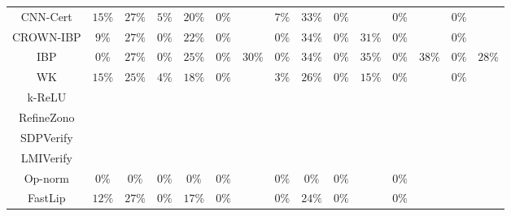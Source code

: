 \begin{table*}
{\begin{tabular}{c|c|c|c|c|c|c|c|c|c|c|c|c|c|c}
     CNN-Cert &        $15\%$ &        $27\%$ &         $5\%$ &        $20\%$ &         $0\%$ &               &         $7\%$ &        $33\%$ &         $0\%$ &               &         $0\%$ &               &         $0\%$ &               \\
    CROWN-IBP &         $9\%$ &        $27\%$ &         $0\%$ &        $22\%$ &         $0\%$ &               &         $0\%$ &        $34\%$ &         $0\%$ &        $31\%$ &         $0\%$ &               &         $0\%$ &               \\
          IBP &         $0\%$ &        $27\%$ &         $0\%$ &        $25\%$ &         $0\%$ &        $30\%$ &         $0\%$ &        $34\%$ &         $0\%$ &        $35\%$ &         $0\%$ &        $38\%$ &         $0\%$ &        $28\%$ \\
           WK &        $15\%$ &        $25\%$ &         $4\%$ &        $18\%$ &         $0\%$ &               &         $3\%$ &        $26\%$ &         $0\%$ &        $15\%$ &         $0\%$ &               &         $0\%$ &               \\
       k-ReLU &               &               &               &               &               &               &               &               &               &               &               &               &               &               \\
   RefineZono &               &               &               &               &               &               &               &               &               &               &               &               &               &               \\
    SDPVerify &               &               &               &               &               &               &               &               &               &               &               &               &               &               \\
    LMIVerify &               &               &               &               &               &               &               &               &               &               &               &               &               &               \\
      Op-norm &         $0\%$ &         $0\%$ &         $0\%$ &         $0\%$ &         $0\%$ &               &         $0\%$ &         $0\%$ &         $0\%$ &               &         $0\%$ &               &               &               \\
      FastLip &        $12\%$ &        $27\%$ &         $0\%$ &        $17\%$ &         $0\%$ &               &         $0\%$ &        $24\%$ &         $0\%$ &               &         $0\%$ &               &               &               \\

\end{tabular}}
\end{table*}
